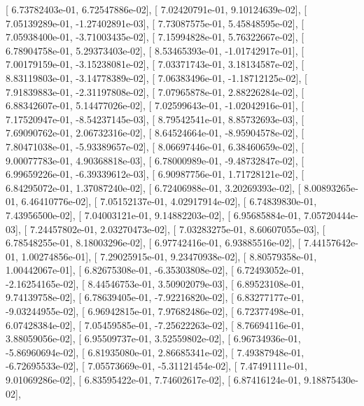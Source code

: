 \documentclass{article}
\begin{document}
       [  6.73782403e-01,   6.72547886e-02],
       [  7.02420791e-01,   9.10124639e-02],
       [  7.05139289e-01,  -1.27402891e-03],
       [  7.73087575e-01,   5.45848595e-02],
       [  7.05938400e-01,  -3.71003435e-02],
       [  7.15994828e-01,   5.76322667e-02],
       [  6.78904758e-01,   5.29373403e-02],
       [  8.53465393e-01,  -1.01742917e-01],
       [  7.00179159e-01,  -3.15238081e-02],
       [  7.03371743e-01,   3.18134587e-02],
       [  8.83119803e-01,  -3.14778389e-02],
       [  7.06383496e-01,  -1.18712125e-02],
       [  7.91839883e-01,  -2.31197808e-02],
       [  7.07965878e-01,   2.88226284e-02],
       [  6.88342607e-01,   5.14477026e-02],
       [  7.02599643e-01,  -1.02042916e-01],
       [  7.17520947e-01,  -8.54237145e-03],
       [  8.79542541e-01,   8.85732693e-03],
       [  7.69090762e-01,   2.06732316e-02],
       [  8.64524664e-01,  -8.95904578e-02],
       [  7.80471038e-01,  -5.93389657e-02],
       [  8.06697446e-01,   6.38460659e-02],
       [  9.00077783e-01,   4.90368818e-03],
       [  6.78000989e-01,  -9.48732847e-02],
       [  6.99659226e-01,  -6.39339612e-03],
       [  6.90987756e-01,   1.71728121e-02],
       [  6.84295072e-01,   1.37087240e-02],
       [  6.72406988e-01,   3.20269393e-02],
       [  8.00893265e-01,   6.46410776e-02],
       [  7.05152137e-01,   4.02917914e-02],
       [  6.74839830e-01,   7.43956500e-02],
       [  7.04003121e-01,   9.14882203e-02],
       [  6.95685884e-01,   7.05720444e-03],
       [  7.24457802e-01,   2.03270473e-02],
       [  7.03283275e-01,   8.60607055e-03],
       [  6.78548255e-01,   8.18003296e-02],
       [  6.97742416e-01,   6.93885516e-02],
       [  7.44157642e-01,   1.00274856e-01],
       [  7.29025915e-01,   9.23470938e-02],
       [  8.80579358e-01,   1.00442067e-01],
       [  6.82675308e-01,  -6.35303808e-02],
       [  6.72493052e-01,  -2.16254165e-02],
       [  8.44546753e-01,   3.50902079e-03],
       [  6.89523108e-01,   9.74139758e-02],
       [  6.78639405e-01,  -7.92216820e-02],
       [  6.83277177e-01,  -9.03244955e-02],
       [  6.96942815e-01,   7.97682486e-02],
       [  6.72377498e-01,   6.07428384e-02],
       [  7.05459585e-01,  -7.25622263e-02],
       [  8.76694116e-01,   3.88059056e-02],
       [  6.95509737e-01,   3.52559802e-02],
       [  6.96734936e-01,  -5.86960694e-02],
       [  6.81935080e-01,   2.86685341e-02],
       [  7.49387948e-01,  -6.72695533e-02],
       [  7.05573669e-01,  -5.31121454e-02],
       [  7.47491111e-01,   9.01069286e-02],
       [  6.83595422e-01,   7.74602617e-02],
       [  6.87416124e-01,   9.18875430e-02],
\end{document}
